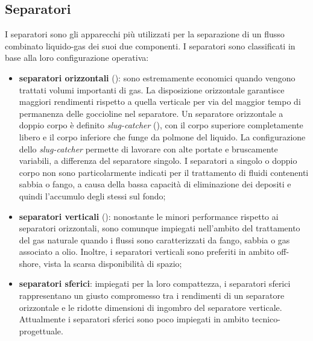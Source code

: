 \subsection{Separatori} %
I separatori sono gli apparecchi più utilizzati per la separazione di un flusso combinato liquido-gas dei suoi due componenti. I separatori sono classificati in base alla loro configurazione operativa:
\begin{itemize}
    \item \textbf{separatori orizzontali} (): sono estremamente economici quando vengono trattati volumi importanti di gas. La disposizione orizzontale garantisce maggiori rendimenti rispetto a quella verticale per via del maggior tempo di permanenza delle goccioline nel separatore. Un separatore orizzontale a doppio corpo è definito \textit{slug-catcher} (), con il corpo superiore completamente libero e il corpo inferiore che funge da polmone del liquido. La configurazione dello \textit{slug-catcher} permette di lavorare con alte portate e bruscamente variabili, a differenza del separatore singolo. I separatori a singolo o doppio corpo non sono particolarmente indicati per il trattamento di fluidi contenenti sabbia o fango, a causa della bassa capacità di eliminazione dei depositi e quindi l'accumulo degli stessi sul fondo;
    \item \textbf{separatori verticali} (): nonostante le minori performance rispetto ai separatori orizzontali, sono comunque impiegati nell'ambito del trattamento del gas naturale quando i flussi sono caratterizzati da fango, sabbia o gas associato a olio. Inoltre, i separatori verticali sono preferiti in ambito off-shore, vista la scarsa disponibilità di spazio;
    \item \textbf{separatori sferici}: impiegati per la loro compattezza, i separatori sferici rappresentano un giusto compromesso tra i rendimenti di un separatore orizzontale e le ridotte dimensioni di ingombro del separatore verticale. Attualmente i separatori sferici sono poco impiegati in ambito tecnico-progettuale.
\end{itemize}

